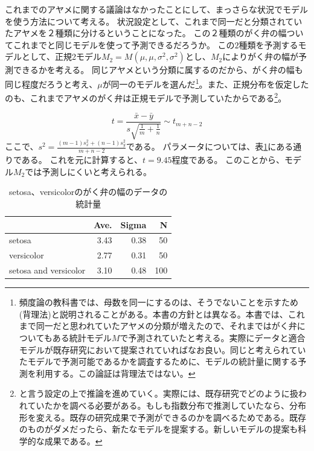 これまでのアヤメに関する議論はなかったことにして、まっさらな状況でモデルを使う方法について考える。
状況設定として、これまで同一だと分類されていたアヤメを２種類に分けるということになった。
この２種類のがく弁の幅ついてこれまでと同じモデルを使って予測できるだろうか。
この$2$種類を予測するモデルとして、正規2モデル$M_2=M(\mu,\mu,\sigma^2,\sigma^2)$とし、$M_2$によりがく弁の幅が予測できるかを考える。
同じアヤメという分類に属するのだから、がく弁の幅も同じ程度だろうと考え、$\mu$が同一のモデルを選んだ\footnote{頻度論の教科書では、母数を同一にするのは、そうでないことを示すため(背理法)と説明されることがある。本書の方針とは異なる。本書では、これまで同一だと思われていたアヤメの分類が増えたので、それまではがく弁についてもある統計モデル$M$で予測されていたと考える。実際にデータと適合モデルが既存研究において提案されていればなお良い。同じと考えられていたモデルで予測可能であるかを調査するために、モデルの統計量に関する予測を利用する。この論証は背理法ではない。}。また、正規分布を仮定したのも、これまでアヤメのがく弁は正規モデルで予測していたからである\footnote{と言う設定の上で推論を進めていく。実際には、既存研究でどのように扱われていたかを調べる必要がある。もしも指数分布で推測していたなら、分布形を変える。既存の研究成果で予測ができるのかを調べるためである。既存のものがダメだったら、新たなモデルを提案する。新しいモデルの提案も科学的な成果である。}。

\begin{equation*}
    t = \frac{\bar{x}-\bar{y}}{s\sqrt{\frac{1}{m} + \frac{1}{n} }} \sim t_{m+n-2}
\end{equation*}
ここで、$s^2=\frac{(m-1)s_x^2+(n-1)s_y^2}{m+n-2}$である。
パラメータについては、表\ref{fig:seto_versi_speal_w_summary}にある通りである。
これを元に計算すると、$t=9.45$程度である。
このことから、モデル$M_2$では予測しにくいと考えられる。

\begin{table}
    \caption{setosa、versicolorのがく弁の幅のデータの統計量}
    \label{fig:seto_versi_speal_w_summary}
    \centering
    \begin{tabular}{lrrr}
        \hline
        {} &  Ave. &  Sigma &   N \\
        \hline \hline
        setosa     &  3.43 &   0.38 &  50 \\
        versicolor &  2.77 &   0.31 &  50 \\
        setosa and versicolor &  3.10 &   0.48 &  100 \\
        \hline
    \end{tabular}
\end{table}


